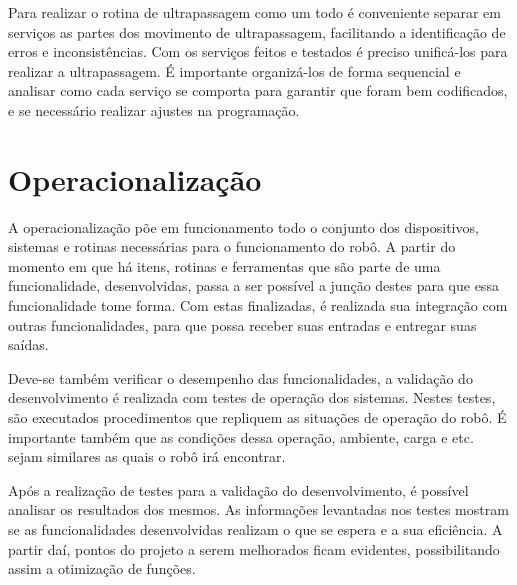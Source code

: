 Para realizar o rotina de ultrapassagem como um todo é conveniente separar em serviços as partes dos movimento de ultrapassagem, facilitando a identificação de erros e inconsistências. Com os serviços feitos e testados é preciso unificá-los para realizar a ultrapassagem. É importante organizá-los de forma sequencial e analisar como cada serviço se comporta para garantir que foram bem codificados, e se necessário realizar ajustes na programação. 

\section{Operacionalização}
\label{sec:operal}
A operacionalização põe em funcionamento todo o conjunto dos dispositivos, sistemas e rotinas necessárias para o funcionamento do robô. A partir do momento em que há itens, rotinas e ferramentas que são parte de uma funcionalidade, desenvolvidas, passa a ser possível a junção destes para que essa funcionalidade tome forma. Com estas finalizadas, é realizada sua integração com outras funcionalidades, para que possa receber suas entradas e entregar suas saídas.

Deve-se também verificar o desempenho das funcionalidades, a validação do desenvolvimento é realizada com testes de operação dos sistemas. Nestes testes, são executados procedimentos que repliquem as situações de operação do robô. É importante também que as condições dessa operação, ambiente, carga e etc. sejam similares as quais o robô irá encontrar.

Após a realização de testes para a validação do desenvolvimento, é possível analisar os resultados dos mesmos. As informações levantadas nos testes mostram se as funcionalidades desenvolvidas realizam o que se espera e a sua eficiência. A partir daí, pontos do projeto a serem melhorados ficam evidentes, possibilitando assim a otimização de funções.

